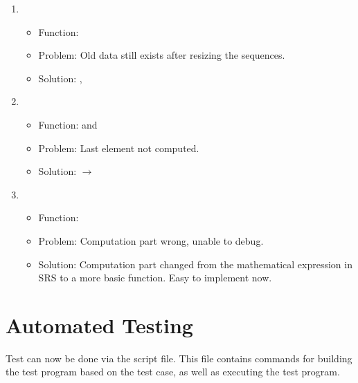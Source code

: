 \documentclass[12pt, titlepage]{article}
\begin{document}
\begin{enumerate}
	\item
	\begin{itemize}
		\item Function: 
		\item Problem: Old data still exists after resizing the sequences. 
		\item Solution: ,\\ 
	\end{itemize}
	\item 
	\begin{itemize}
		\item Function:  and 
		\item Problem: Last element not computed. 
		\item Solution: \licpp{<} $\rightarrow$ \licpp{<=}
	\end{itemize}
	\item
	\begin{itemize}
		\item Function: 
		\item Problem: Computation part wrong, unable to debug. 
		\item Solution: Computation part changed from the mathematical expression in SRS to a more basic function. Easy to implement now.
	\end{itemize}
\end{enumerate}

\section{Automated Testing}
Test can now be done via the  script file. This file contains commands for building the test program based on the test case, as well as executing the test program.
	
\end{document}
